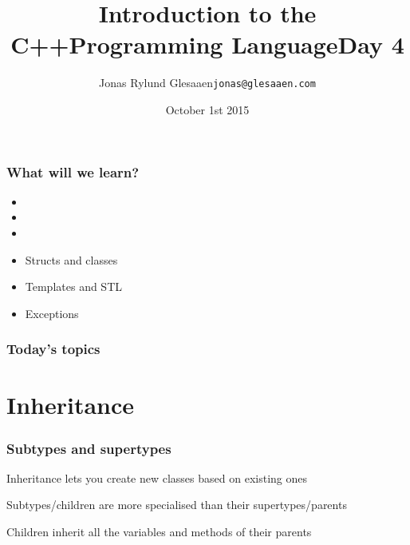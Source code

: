\documentclass[14pt,a4paper,dvipsnames,usenames]{beamer}
\title[C++ Day4]{Introduction to the C++\newline{}Programming Language\newline{}\newline{}\fontsize{16pt}{16pt}\selectfont{}Day 4}
\author{\texorpdfstring{%
    Jonas Rylund Glesaaen\newline\fontsize{12pt}{12pt}\selectfont\texttt{jonas@glesaaen.com}%
  }{%
    Jonas Rylund Glesaaen}}
\date{October 1st 2015}
\begin{document}
\frame{\titlepage}

\begin{frame}
  \frametitle{What will we learn?}

  \begin{itemize}
    \setlength\itemsep{.5em}
    \item {}
    \item {}
    \item {}
    \item Structs and classes 
    \item Templates and STL 
    \item Exceptions 
  \end{itemize}
\end{frame}

\begin{frame}
  \frametitle{Today's topics}

  \tableofcontents
  
\end{frame}

\section{Inheritance}

\frame[plain]{\sectionpage}

\begin{frame}
  \frametitle{Subtypes and supertypes}

  Inheritance lets you create new classes based on existing ones

  \vspace{1em}
  Subtypes/children are more specialised than their supertypes/parents

  \vspace{1em}
  Children inherit all the variables and methods of their parents

\end{frame}
\end{document}
